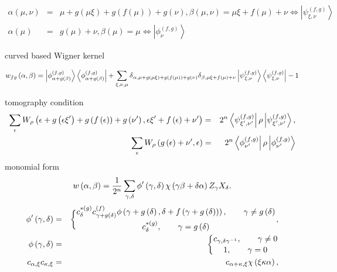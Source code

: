 \documentclass{article}
\begin{document}
\begin{eqnarray}
\alpha \left( \mu ,\nu \right)  &=&\mu +g\left( \mu \xi \right) +g\left(
f\left( \mu \right) \right) +g\left( \nu \right) ,\beta \left( \mu ,\nu
\right) =\mu \xi +f\left( \mu \right) +\nu \Leftrightarrow \left\vert \psi
_{\xi ,\nu }^{\left( f,g\right) }\right\rangle   \label{PC} \\
\alpha \left( \mu \right)  &=&g\left( \mu \right) +\nu ,\beta \left( \mu
\right) =\mu \Leftrightarrow \left\vert \phi _{\nu }^{\left( f,g\right)
}\right\rangle 
\end{eqnarray}

curved based Wigner kernel

\begin{equation*}
w_{fg}\left( \alpha ,\beta \right) =\left\vert \phi _{\alpha +g\left( \beta
\right) }^{\left( f,g\right) }\right\rangle \left\langle \phi _{\alpha
+g\left( \beta \right) }^{\left( f,g\right) }\right\vert +\dsum\limits_{\xi
,\nu ,\mu }\delta _{\alpha ,\mu +g\left( \mu \xi \right) +g\left( f\left(
\mu \right) \right) +g\left( \nu \right) }\delta _{\beta ,\mu \xi +f\left(
\mu \right) +\nu }\left\vert \psi _{\xi ,\nu }^{\left( f,g\right)
}\right\rangle \left\langle \psi _{\xi ,\nu }^{\left( f,g\right)
}\right\vert -1
\end{equation*}

tomography condition%
\begin{eqnarray*}
\dsum\limits_{\epsilon }W_{\rho }\left( \epsilon +g\left( \epsilon \xi
^{\prime }\right) +g\left( f\left( \epsilon \right) \right) +g\left( \nu
^{\prime }\right) ,\epsilon \xi ^{\prime }+f\left( \epsilon \right) +\nu
^{\prime }\right)  &=&2^{n}\left\langle \psi _{\xi ^{\prime },\nu ^{\prime
}}^{\left( f,g\right) }\right\vert \rho \left\vert \psi _{\xi ^{\prime },\nu
^{\prime }}^{\left( f,g\right) }\right\rangle , \\
\dsum\limits_{\epsilon }W_{\rho }\left( g\left( \epsilon \right) +\nu
^{\prime },\epsilon \right)  &=&2^{n}\left\langle \phi _{\nu ^{\prime
}}^{\left( f,g\right) }\right\vert \rho \left\vert \phi _{\nu ^{\prime
}}^{\left( f,g\right) }\right\rangle 
\end{eqnarray*}%
monomial form%
\begin{equation*}
w\left( \alpha ,\beta \right) =\frac{1}{2^{n}}\dsum\limits_{\gamma ,\delta
}\phi ^{\prime }\left( \gamma ,\delta \right) \chi \left( \gamma \beta
+\delta \alpha \right) Z_{\gamma }X_{\delta }.
\end{equation*}
\begin{eqnarray*}
\phi ^{\prime }\left( \gamma ,\delta \right)  &=&\QATOPD\{ . {c_{\delta
}^{\ast \left( g\right) }c_{\gamma +g\left( \delta \right) }^{\left(
f\right) }\phi \left( \gamma +g\left( \delta \right) ,\delta +f\left( \gamma
+g\left( \delta \right) \right) \right) ,\qquad \gamma \neq g\left( \delta
\right) }{c_{\delta }^{\ast \left( g\right) },\qquad \gamma =g\left( \delta
\right) }, \\
\phi \left( \gamma ,\delta \right)  &=&\QATOPD\{ . {c_{\gamma ,\delta \gamma
^{-1}},\qquad \gamma \neq 0}{1,\qquad \gamma =0} \\
c_{\alpha ,\xi }c_{\kappa ,\xi } &=&c_{\alpha +\kappa ,\xi }\chi \left( \xi
\kappa \alpha \right) ,
\end{eqnarray*}
\end{document}
